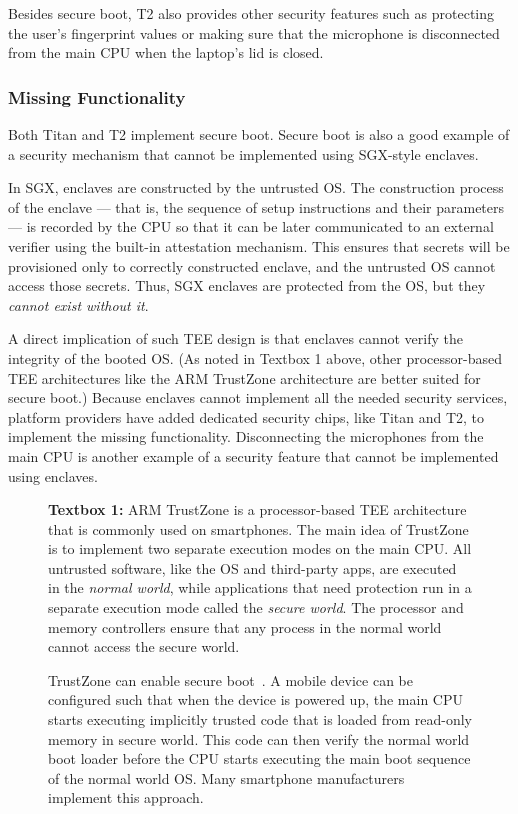 Besides secure boot, T2 also provides other security features such as protecting the user's fingerprint values or making sure that the microphone is disconnected from the main CPU when the laptop's lid is closed. 
 
 
\subsubsection*{Missing Functionality}
  
Both Titan and T2 implement secure boot. Secure boot is also a good example of a security mechanism that cannot be implemented using SGX-style enclaves. 

In SGX, enclaves are constructed by the untrusted OS. The construction process of the enclave --- that is, the sequence of setup instructions and their parameters --- is recorded by the CPU so that it can be later communicated to an external verifier using the built-in attestation mechanism. This ensures that secrets will be provisioned only to correctly constructed enclave, and the untrusted OS cannot access those secrets. Thus, SGX enclaves are protected from the OS, but they \emph{cannot exist without it}. 

A direct implication of such TEE design is that enclaves cannot verify the integrity of the booted OS. (As noted in Textbox 1 above, other processor-based TEE architectures like the ARM TrustZone architecture are better suited for secure boot.) Because enclaves cannot implement all the needed security services, platform providers have added dedicated security chips, like Titan and T2, to implement the missing functionality. Disconnecting the microphones from the main CPU is another example of a security feature that cannot be implemented using enclaves.


\begin{figure}
    \begin{tcolorbox}
    \textbf{Textbox 1:} 
    ARM TrustZone is a processor-based TEE architecture that is commonly used on smartphones. The main idea of TrustZone is to implement two separate execution modes on the main CPU. All untrusted software, like the OS and third-party apps, are executed in the \emph{normal world}, while applications that need protection run in a separate execution mode called the \emph{secure world}. The processor and memory controllers ensure that any process in the normal world cannot access the secure world.
    
    \hspace{10pt} TrustZone can enable secure boot~\cite{ekberg2014untapped}. A mobile device can be configured such that when the device is powered up, the main CPU starts executing implicitly trusted code that is loaded from read-only memory in secure world. This code can then verify the normal world boot loader before the CPU starts executing the main boot sequence of the normal world OS. Many smartphone manufacturers implement this approach.
	\end{tcolorbox}
\end{figure}  

